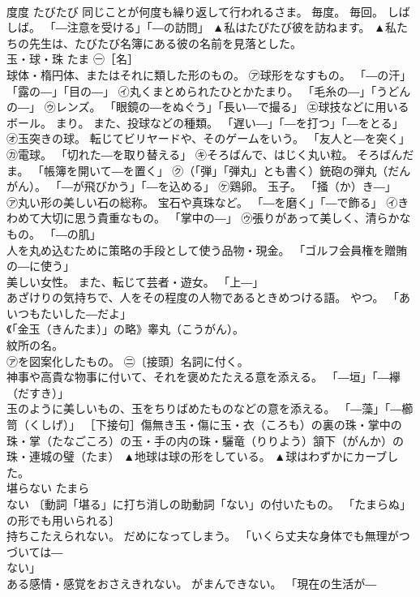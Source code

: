 \documentclass[8pt]{extreport}
\begin{document}
\begin{CJK}{UTF8}{min}
\\	度度	たびたび	同じことが何度も繰り返して行われるさま。 毎度。 毎回。 しばしば。 「―注意を受ける」「―の訪問」	▲私はたびたび彼を訪ねます。 ▲私たちの先生は、たびたび名簿にある彼の名前を見落とした。
\\	玉・球・珠	たま	㊀［名］ 
\\	球体・楕円体、またはそれに類した形のもの。 ㋐球形をなすもの。 「―の汗」「露の―」「目の―」 ㋑丸くまとめられたひとかたまり。 「毛糸の―」「うどんの―」 ㋒レンズ。 「眼鏡の―をぬぐう」「長い―で撮る」 ㋓球技などに用いるボール。 まり。 また、投球などの種類。 「遅い―」「―を打つ」「―をとる」 ㋔玉突きの球。 転じてビリヤードや、そのゲームをいう。 「友人と―を突く」 ㋕電球。 「切れた―を取り替える」 ㋖そろばんで、はじく丸い粒。 そろばんだま。 「帳簿を開いて―を置く」 ㋗（「弾」「弾丸」とも書く）銃砲の弾丸（だんがん）。 「―が飛びかう」「―を込める」 ㋘鶏卵。 玉子。 「掻（か）き―」 
\\	㋐丸い形の美しい石の総称。 宝石や真珠など。 「―を磨く」「―で飾る」 ㋑きわめて大切に思う貴重なもの。 「掌中の―」 ㋒張りがあって美しく、清らかなもの。 「―の肌」 
\\	人を丸め込むために策略の手段として使う品物・現金。 「ゴルフ会員権を贈賄の―に使う」 
\\	美しい女性。 また、転じて芸者・遊女。 「上―」 
\\	あざけりの気持ちで、人をその程度の人物であるときめつける語。 やつ。 「あいつもたいした―だよ」 
\\	《「金玉（きんたま）」の略》睾丸（こうがん）。 
\\	紋所の名。 
\\	㋐を図案化したもの。 ㊁〔接頭〕名詞に付く。 
\\	神事や高貴な物事に付いて、それを褒めたたえる意を添える。 「―垣」「―襷（だすき）」 
\\	玉のように美しいもの、玉をちりばめたものなどの意を添える。 「―藻」「―櫛笥（くしげ）」 ［下接句］傷無き玉・傷に玉・衣（ころも）の裏の珠・掌中の珠・掌（たなごころ）の玉・手の内の珠・驪竜（りりよう）頷下（がんか）の珠・連城の璧（たま）	▲地球は球の形をしている。 ▲球はわずかにカーブした。
\\	堪らない	たまら
\\	ない	〔動詞「堪る」に打ち消しの助動詞「ない」の付いたもの。 「たまらぬ」の形でも用いられる〕 
\\	持ちこたえられない。 だめになってしまう。 「いくら丈夫な身体でも無理がつづいては―
\\	ない」 
\\	ある感情・感覚をおさえきれない。 がまんできない。 「現在の生活が―

\end{CJK}
\end{document}
